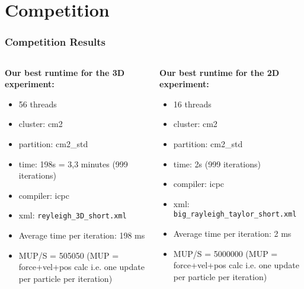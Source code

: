 
\section{Competition}
\label{sec:competition}

\begin{frame}
    \frametitle{Competition Results}

    \begin{columns}
        \begin{column}{0.5\textwidth}
            \textbf{Our best runtime for the 3D experiment:}

            \begin{itemize}
                \item 56 threads 
                \item cluster: cm2
                \item partition: cm2\_std
                \item time: 198s = 3,3 minutes (999 iterations)
                \item compiler: icpc
                \item xml: \texttt{reyleigh\_3D\_short.xml} 
                \item Average time per iteration: 198 ms
                \item MUP/S = 505050 (MUP = force+vel+pos calc i.e. one update per particle per iteration)
            \end{itemize}
        \end{column}
        \vrule
        \vspace{20pt}
        \begin{column}{0.5\textwidth}
            \textbf{Our best runtime for the 2D experiment:}

            \begin{itemize}
                \item 16 threads 
                \item cluster: cm2
                \item partition: cm2\_std
                \item time: 2s (999 iterations)
                \item compiler: icpc
                \item xml: \texttt{big\_rayleigh\_taylor\_short.xml}
                \item Average time per iteration: 2 ms
                \item MUP/S = 5000000 (MUP = force+vel+pos calc i.e. one update per particle per iteration)
            \end{itemize}
        \end{column}
    \end{columns}
\end{frame}